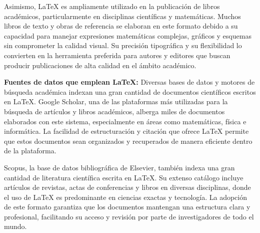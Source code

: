 \documentclass[12pt,twocolumn]{article}
\begin{document}
Asimismo, LaTeX es ampliamente utilizado en la publicación de libros académicos, particularmente en disciplinas científicas y matemáticas. 
Muchos libros de texto y obras de referencia se elaboran en este formato debido a su capacidad para manejar expresiones matemáticas complejas, gráficos y esquemas sin comprometer la calidad visual. 
Su precisión tipográfica y su flexibilidad lo convierten en la herramienta preferida para autores y editores que buscan producir publicaciones de alta calidad en el ámbito académico.

{\raggedleft \textbf{Fuentes de datos que emplean LaTeX:}}
Diversas bases de datos y motores de búsqueda académica indexan una gran cantidad de documentos científicos escritos en LaTeX. 
Google Scholar, una de las plataformas más utilizadas para la búsqueda de artículos y libros académicos, alberga miles de documentos elaborados con este sistema, especialmente en áreas como matemáticas, física e informática. 
La facilidad de estructuración y citación que ofrece LaTeX permite que estos documentos sean organizados y recuperados de manera eficiente dentro de la plataforma.

Scopus, la base de datos bibliográfica de Elsevier, también indexa una gran cantidad de literatura científica escrita en LaTeX. 
Su extenso catálogo incluye artículos de revistas, actas de conferencias y libros en diversas disciplinas, donde el uso de LaTeX es predominante en ciencias exactas y tecnología. 
La adopción de este formato garantiza que los documentos mantengan una estructura clara y profesional, facilitando su acceso y revisión por parte de investigadores de todo el mundo.
\end{document}

